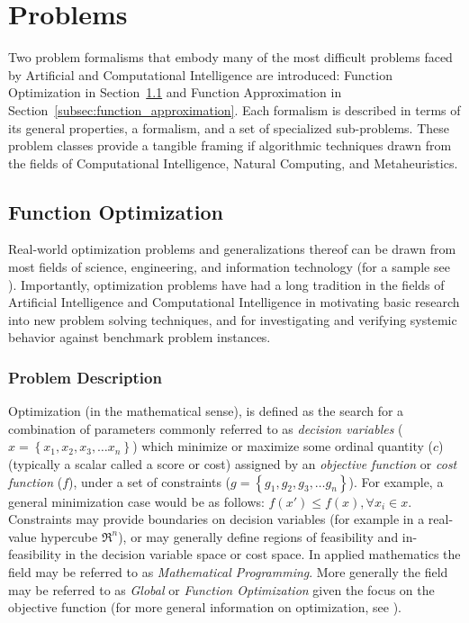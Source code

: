 \documentclass[a4paper, 11pt]{article}
\begin{document}
% 
% 
\section{Problems}
\label{sec:problems}


Two problem formalisms that embody many of the most difficult problems faced by Artificial and Computational Intelligence are introduced: Function Optimization in Section~\ref{subsec:function_optimization} and Function Approximation in Section~\ref{subsec:function_approximation}. Each formalism is described in terms of its general properties, a formalism, and a set of specialized sub-problems. These problem classes provide a tangible framing if algorithmic techniques drawn from the fields of Computational Intelligence, Natural Computing, and Metaheuristics.

% 
%
\subsection{Function Optimization}
\label{subsec:function_optimization}
Real-world optimization problems and generalizations thereof can be drawn from most fields of science, engineering, and information technology (for a sample see \cite{Ali1997, Toern1999}). Importantly, optimization problems have had a long tradition in the fields of Artificial Intelligence and Computational Intelligence in motivating basic research into new problem solving techniques, and for investigating and verifying systemic behavior against benchmark problem instances.

%
%
\subsubsection{Problem Description}
Optimization (in the mathematical sense), is defined as the search for a combination of parameters commonly referred to as \emph{decision variables} ($x = \left\{x_1, x_2, x_3, \ldots x_n\right\}$) which minimize or maximize some ordinal quantity ($c$) (typically a scalar  called a score or cost) assigned by an \emph{objective function} or \emph{cost function} ($f$), under a set of constraints ($g = \left\{g_1, g_2, g_3, \ldots g_n\right\}$). For example, a general minimization case would be as follows: $f(x\prime) \leq f(x), \forall x_i \in x$. Constraints may provide boundaries on decision variables (for example in a real-value hypercube $\Re^n$), or may generally define regions of feasibility and in-feasibility in the decision variable space or cost space. In applied mathematics the field may be referred to as \emph{Mathematical Programming}. More generally the field may be referred to as \emph{Global} or \emph{Function Optimization} given the focus on the objective function (for more general information on optimization, see \cite{Horst2000}). 
\end{document}

